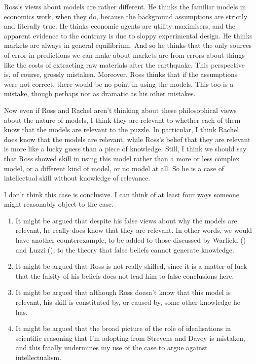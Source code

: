 \documentclass[
  11pt,
  letterpaper,
  DIV=11,
  numbers=noendperiod,
  oneside]{scrartcl}
\providecommand{\tightlist}{%
  \setlength{\itemsep}{0pt}\setlength{\parskip}{0pt}}\usepackage{longtable,booktabs,array}
\begin{document}
Ross's views about models are rather different. He thinks the familiar
models in economics work, when they do, because the background
assumptions are strictly and literally true. He thinks economic agents
are utility maximisers, and the apparent evidence to the contrary is due
to sloppy experimental design. He thinks markets are always in general
equilibrium. And so he thinks that the only sources of error in
predictions we can make about markets are from errors about things like
the costs of extracting raw materials after the earthquake. This
perspective is, of course, grossly mistaken. Moreover, Ross thinks that
if the assumptions were not correct, there would be no point in using
the models. This too is a mistake, though perhaps not as dramatic as his
other mistakes.

Now even if Ross and Rachel aren't thinking about these philosophical
views about the nature of models, I think they are relevant to whether
each of them know that the models are relevant to the puzzle. In
particular, I think Rachel does know that the models are relevant, while
Ross's belief that they are relevant is more like a lucky guess than a
piece of knowledge. Still, I think we should say that Ross showed skill
in using this model rather than a more or less complex model, or a
different kind of model, or no model at all. So he is a case of
intellectual skill without knowledge of relevance.

I don't think this case is conclusive. I can think of at least four ways
someone might reasonably object to the case.

\begin{enumerate}
\def\labelenumi{\arabic{enumi}.}
\tightlist
\item
  It might be argued that despite his false views about why the models
  are relevant, he really does know that they are relevant. In other
  words, we would have another counterexample, to be added to those
  discussed by Warfield () and Luzzi
  (), to the theory that false beliefs
  cannot generate knowledge.
\item
  It might be argued that Ross is not really skilled, since it is a
  matter of luck that the falsity of his beliefs does not lead him to
  false conclusions here.
\item
  It might be argued that although Ross doesn't know that this model is
  relevant, his skill is constituted by, or caused by, some other
  knowledge he has.
\item
  It might be argued that the broad picture of the role of idealisations
  in scientific reasoning that I'm adopting from Strevens and Davey is
  mistaken, and this fatally undermines my use of the case to argue
  against intellectualism.
\end{enumerate}
\end{document}
